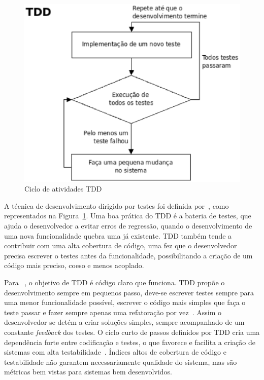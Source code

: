 \begin{figure}[h]
    \centering
    \includegraphics[keepaspectratio=true,scale=0.50]
      {figuras/tdd_ciclo.eps}
    \caption{Ciclo de atividades TDD~\cite{beck2002}}
    \label{tdd_ciclo}
\end{figure}

A técnica de desenvolvimento dirigido por testes foi definida por~, como
representados na Figura~\ref{tdd_ciclo}.
%
Uma boa prática do TDD é a bateria de testes, que ajuda o desenvolvedor a evitar 
erros de regressão, quando o desenvolvimento de uma nova funcionalidade quebra uma 
já existente.
%
TDD também tende a contribuir com uma alta cobertura de código, uma 
fez que o desenvolvedor precisa escrever o testes antes da funcionalidade, 
possibilitando a criação de um código mais preciso, coeso e menos acoplado. 

Para ~, o objetivo de TDD é código claro que 
funciona.
%
TDD propõe o desenvolvimento sempre em pequenos passo, deve-se escrever testes sempre 
para uma menor funcionalidade possível, escrever o código mais simples que faça o 
teste passar e fazer sempre apenas uma refatoração por vez~\cite{beck2002}. Assim o 
desenvolvedor se detém a criar soluções simples, sempre acompanhado de um constante 
\textit{feedback} dos testes.
%
O ciclo curto de passos definidos por TDD cria uma dependência forte entre codificação 
e testes, o que favorece e facilita a criação de sistemas com alta testabilidade~\cite{bernardo2011}. 
%
Índices altos de cobertura de código e testabilidade não garantem necessariamente 
qualidade do sistema, mas são métricas bem vistas para sistemas bem desenvolvidos.

